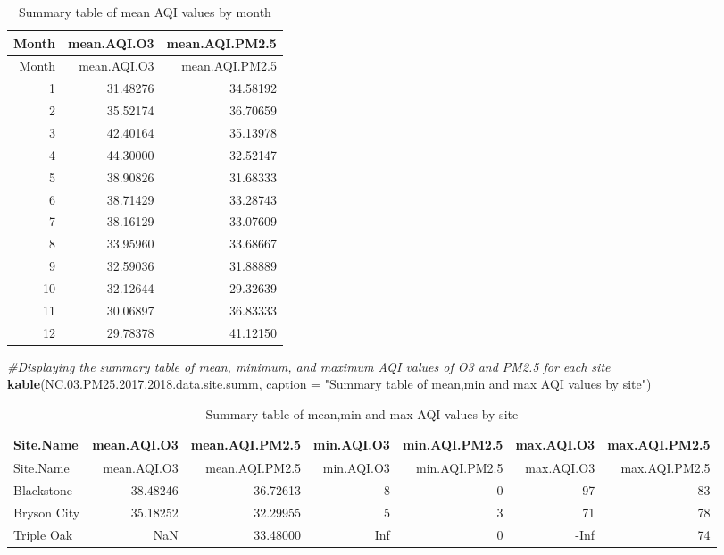 \documentclass[]{article}
\newenvironment{Shaded}{\begin{snugshade}}{\end{snugshade}}
\newcommand{\KeywordTok}[1]{\textcolor[rgb]{0.13,0.29,0.53}{\textbf{#1}}}
\newcommand{\DataTypeTok}[1]{\textcolor[rgb]{0.13,0.29,0.53}{#1}}
\newcommand{\FloatTok}[1]{\textcolor[rgb]{0.00,0.00,0.81}{#1}}
\newcommand{\StringTok}[1]{\textcolor[rgb]{0.31,0.60,0.02}{#1}}
\newcommand{\CommentTok}[1]{\textcolor[rgb]{0.56,0.35,0.01}{\textit{#1}}}
\newcommand{\NormalTok}[1]{#1}
\begin{document}
\begin{longtable}[]{@{}rrr@{}}
\caption{Summary table of mean AQI values by month}\tabularnewline
\toprule
Month & mean.AQI.O3 & mean.AQI.PM2.5\tabularnewline
\midrule
\endfirsthead
\toprule
Month & mean.AQI.O3 & mean.AQI.PM2.5\tabularnewline
\midrule
\endhead
1 & 31.48276 & 34.58192\tabularnewline
2 & 35.52174 & 36.70659\tabularnewline
3 & 42.40164 & 35.13978\tabularnewline
4 & 44.30000 & 32.52147\tabularnewline
5 & 38.90826 & 31.68333\tabularnewline
6 & 38.71429 & 33.28743\tabularnewline
7 & 38.16129 & 33.07609\tabularnewline
8 & 33.95960 & 33.68667\tabularnewline
9 & 32.59036 & 31.88889\tabularnewline
10 & 32.12644 & 29.32639\tabularnewline
11 & 30.06897 & 36.83333\tabularnewline
12 & 29.78378 & 41.12150\tabularnewline
\bottomrule
\end{longtable}

\begin{Shaded}
\begin{Highlighting}[]
\CommentTok{#Displaying the summary table of mean, minimum, and maximum AQI values of O3 and PM2.5 for each site}
\KeywordTok{kable}\NormalTok{(NC.}\FloatTok{03.}\NormalTok{PM25.}\FloatTok{2017.2018}\NormalTok{.data.site.summ, }\DataTypeTok{caption =} \StringTok{"Summary table of mean,min and max AQI values by site"}\NormalTok{)}
\end{Highlighting}
\end{Shaded}

\begin{longtable}[]{@{}lrrrrrr@{}}
\caption{Summary table of mean,min and max AQI values by
site}\tabularnewline
\toprule
Site.Name & mean.AQI.O3 & mean.AQI.PM2.5 & min.AQI.O3 & min.AQI.PM2.5 &
max.AQI.O3 & max.AQI.PM2.5\tabularnewline
\midrule
\endfirsthead
\toprule
Site.Name & mean.AQI.O3 & mean.AQI.PM2.5 & min.AQI.O3 & min.AQI.PM2.5 &
max.AQI.O3 & max.AQI.PM2.5\tabularnewline
\midrule
\endhead
Blackstone & 38.48246 & 36.72613 & 8 & 0 & 97 & 83\tabularnewline
Bryson City & 35.18252 & 32.29955 & 5 & 3 & 71 & 78\tabularnewline
Triple Oak & NaN & 33.48000 & Inf & 0 & -Inf & 74\tabularnewline
\bottomrule
\end{longtable}
\end{document}
